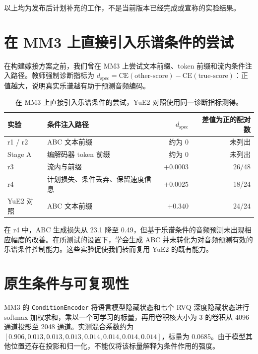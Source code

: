 \documentclass[11pt,a4paper,fontset=fandol]{ctexart}
\newcommand{\code}[1]{\texttt{#1}}
\begin{document}
以上均为发布后计划补充的工作，不是当前版本已经完成或宣称的实验结果。

\appendix
\section{在 MM3 上直接引入乐谱条件的尝试}
\label{app:direct}

在构建嫁接方案之前，我们曾在 MM3 上尝试文本前缀、token 前缀和流内条件注入路径。教师强制诊断指标为 $d_{\mathrm{spec}} = \mathrm{CE}(\text{other-score}) - \mathrm{CE}(\text{true-score})$：正值越大，说明真实乐谱越有助于预测音频编码。

\begin{table}[H]
    \centering
    \caption{在 MM3 上直接引入乐谱条件的尝试，YuE2 对照使用同一诊断指标测得。}
    \label{tab:direct}
    \footnotesize
    \begin{tabular}{llrr}
        \toprule
        实验 & 条件注入路径 & $d_{\mathrm{spec}}$ & 差值为正的配对数 \\
        \midrule
        r1 / r2 & ABC 文本前缀 & 约为 0 & 未列出 \\
        Stage A & 编解码器 token 前缀 & 约为 0 & 未列出 \\
        r3 & 流内与前缀 & $+0.0003$ & 26/48 \\
        r4 & 计划损失、条件丢弃、保留速度信息 & $+0.0025$ & 18/24 \\
        YuE2 对照 & ABC 文本前缀 & $+0.340$ & 24/24 \\
        \bottomrule
    \end{tabular}
\end{table}

在 r4 中，ABC 生成损失从 23.1 降至 0.49，但基于乐谱条件的音频预测未出现相应幅度的改善。在所测试的设置下，学会生成 ABC 并未转化为对音频预测有效的乐谱条件控制能力。这些实验促使我们转而复用 YuE2 的既有能力。

\section{原生条件与可复现性}
\label{app:native}

MM3 的 \code{ConditionEncoder} 将语言模型隐藏状态和七个 RVQ 深度隐藏状态进行 softmax 加权求和，乘以一个可学习的标量，再用卷积核大小为 3 的卷积从 4096 通道投影至 2048 通道。实测混合系数约为 $[0.906, 0.013, 0.013, 0.013, 0.014, 0.014, 0.014, 0.014]$，标量为 0.0685。由于模型其他位置还存在投影和归一化，不能仅将该标量解释为条件作用的强度。
\end{document}
